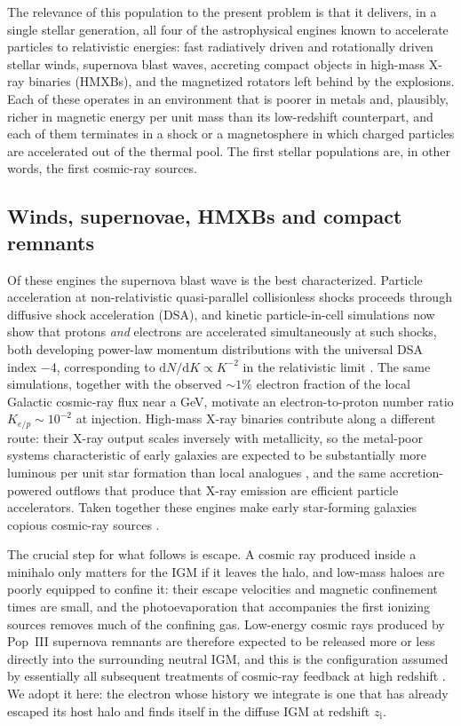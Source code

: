 \documentclass[twocolumn]{article}
\newcommand{\zi}{z_{\mathrm{i}}}
\begin{document}
The relevance of this population to the present problem is that it delivers,
in a single stellar generation, all four of the astrophysical engines known to
accelerate particles to relativistic energies: fast radiatively driven and
rotationally driven stellar winds, supernova blast waves, accreting compact
objects in high-mass X-ray binaries (HMXBs), and the magnetized rotators left
behind by the explosions. Each of these operates in an environment that is
poorer in metals and, plausibly, richer in magnetic energy per unit mass than
its low-redshift counterpart, and each of them terminates in a shock or a
magnetosphere in which charged particles are accelerated out of the thermal
pool. The first stellar populations are, in other words, the first cosmic-ray
sources.

\subsection{Winds, supernovae, HMXBs and compact remnants}

Of these engines the supernova blast wave is the best characterized. Particle
acceleration at non-relativistic quasi-parallel collisionless shocks proceeds
through diffusive shock acceleration (DSA), and kinetic particle-in-cell
simulations now show that protons \emph{and} electrons are accelerated
simultaneously at such shocks, both developing power-law momentum distributions
with the universal DSA index $-4$, corresponding to
$\mathrm{d}N/\mathrm{d}K \propto K^{-2}$ in the relativistic limit
\citep{Park2015}. The same simulations, together with the observed
$\sim\!1\%$ electron fraction of the local Galactic cosmic-ray flux near a
GeV, motivate an electron-to-proton number ratio $K_{e/p} \sim 10^{-2}$ at
injection. High-mass X-ray binaries contribute along a different route: their
X-ray output scales inversely with metallicity, so the metal-poor systems
characteristic of early galaxies are expected to be substantially more
luminous per unit star formation than local analogues \citep{Kaur2022}, and the
same accretion-powered outflows that produce that X-ray emission are efficient
particle accelerators. Taken together these engines make early star-forming
galaxies copious cosmic-ray sources \citep{Owen2017,Ruszkowski2023}.

The crucial step for what follows is escape. A cosmic ray produced inside a
minihalo only matters for the IGM if it leaves the halo, and low-mass haloes
are poorly equipped to confine it: their escape velocities and magnetic
confinement times are small, and the photoevaporation that accompanies the
first ionizing sources removes much of the confining gas. Low-energy cosmic
rays produced by Pop~III supernova remnants are therefore expected to be
released more or less directly into the surrounding neutral IGM, and this is
the configuration assumed by essentially all subsequent treatments of
cosmic-ray feedback at high redshift \citep{Sazonov2015,Leite2017,Jana2018}. We
adopt it here: the electron whose history we integrate is one that has already
escaped its host halo and finds itself in the diffuse IGM at redshift $\zi$.
\end{document}
